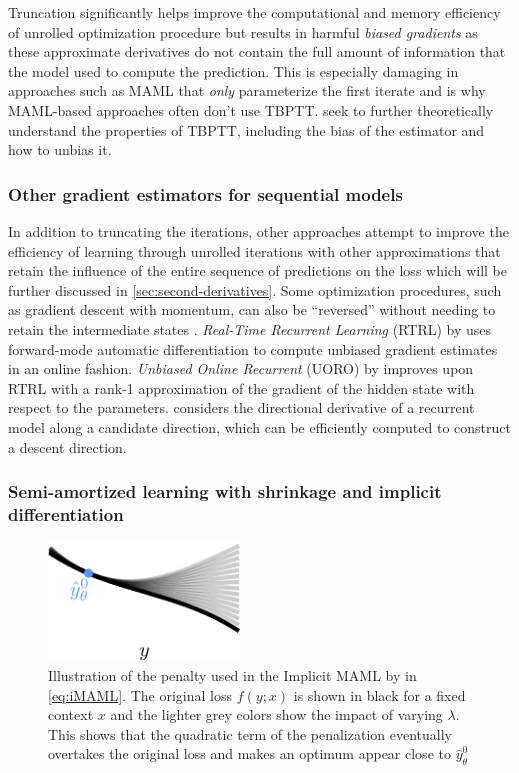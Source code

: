 Truncation significantly helps improve the computational
and memory efficiency of unrolled optimization procedure
but results in harmful \emph{biased gradients} as
these approximate derivatives do not contain
the full amount of information that the model used
to compute the prediction.
This is especially damaging in approaches
such as MAML \citep{finn2017model} that \emph{only}
parameterize the first iterate and is why MAML-based
approaches often don't use TBPTT.
\citet{tallec2017unbiasing,wu2018understanding,liao2018reviving,shaban2019truncated,vicol2021unbiased}
seek to further theoretically understand the properties
of TBPTT, including the bias of the estimator
and how to unbias it.

\subsubsection{Other gradient estimators for sequential models}
In addition to truncating the iterations, other approaches
attempt to improve the efficiency of learning through
unrolled iterations with other approximations
that retain the influence of the entire sequence
of predictions on the loss
\citep{finn2017model,nichol2018first,lorraine2020optimizing}
which will be further discussed in
\cref{sec:second-derivatives}.
Some optimization procedures, such as gradient descent with momentum,
can also be ``reversed'' without needing to retain the
intermediate states \citep{maclaurin2015gradient,franceschi2017forward}.
\emph{Real-Time Recurrent Learning} (RTRL) by \citet{williams1989learning}
uses forward-mode automatic differentiation to compute unbiased
gradient estimates in an online fashion.
\emph{Unbiased Online Recurrent} (UORO) by \citet{tallec2017unbiased}
improves upon RTRL with a rank-1 approximation of the gradient
of the hidden state with respect to the parameters.
\citet{silver2022learning} considers the directional derivative
of a recurrent model along a candidate direction, which can
be efficiently computed to construct a descent direction.


\subsubsection{Semi-amortized learning with shrinkage and implicit differentiation}
\begin{figure}[t]
\centering
\includegraphics[width=2in]{fig/imaml.pdf}
\caption{Illustration of the penalty used in the Implicit MAML
  by \citet{rajeswaran2019meta} in \cref{eq:iMAML}.
  The original loss $f(y; x)$ is shown in black for
  a fixed context $x$ and the lighter grey colors
  show the impact of varying $\lambda$.
  This shows that the quadratic term of the penalization eventually
  overtakes the original loss and makes an optimum appear
  close to $\hat y_\theta^0$}
\label{fig:imaml}
\end{figure}

